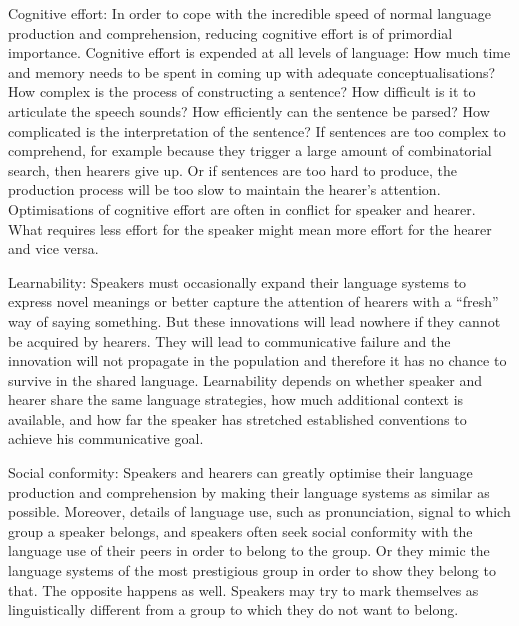 {\bfshape Cognitive effort}: In order to cope with the incredible speed of normal language production and comprehension, 
reducing cognitive effort is of primordial importance. Cognitive effort is expended at all levels
of language: How much time and memory 
needs to be spent in coming up with adequate conceptualisations? How complex is the process of constructing
a sentence? How 
difficult is it to articulate the speech sounds? How efficiently can the sentence be parsed? How complicated is the 
interpretation of the sentence? If sentences are too 
complex to comprehend, for example because they trigger a large amount of combinatorial search, then 
hearers give up. Or if sentences 
are too hard to produce, the production process will be too slow to maintain the hearer's attention. 
Optimisations of cognitive effort are often in conflict for speaker and hearer. What requires less effort for the 
speaker might mean more effort for the hearer and vice versa. 

{\bfshape Learnability}: Speakers must occasionally expand their language systems to express novel meanings or 
better capture the attention of hearers with a ``fresh'' way of saying something. But these innovations will 
lead nowhere if they cannot be acquired by hearers. They will lead to communicative failure and 
the innovation will not propagate in the population and therefore it has no chance to survive in the shared language.
Learnability depends on whether speaker and hearer share the same language strategies, how much additional context 
is available, and how far the speaker has stretched established conventions to achieve his communicative goal. 

{\bfshape Social conformity}: Speakers and hearers can greatly optimise their language production and 
comprehension by making their language systems as similar as possible. Moreover, details of language use, such 
as pronunciation, signal to which group a speaker belongs, and speakers often seek social conformity with the 
language use of their peers in order to belong to the group. Or they mimic the language systems 
of the most prestigious group in order to show they belong to that. The opposite happens as well. Speakers 
may try to mark themselves as linguistically different from a group to which they do not want to belong. 

